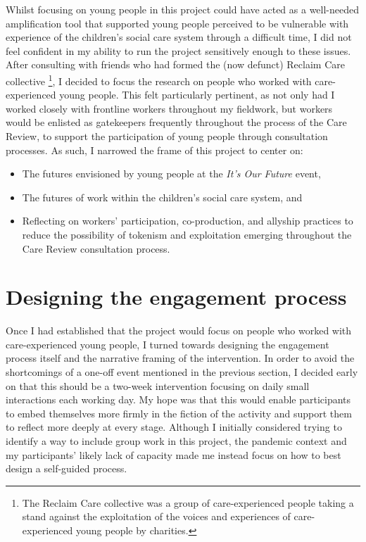 Whilst focusing on young people in this project could have acted as a well-needed amplification tool that supported young people perceived to be vulnerable with experience of the children's social care system through a difficult time, I did not feel confident in my ability to run the project sensitively enough to these issues. After consulting with friends who had formed the (now defunct) Reclaim Care collective \footnote{The Reclaim Care collective was a group of care-experienced people taking a stand against the exploitation of the voices and experiences of care-experienced young people by charities.}, I decided to focus the research on people who worked with care-experienced young people. This felt particularly pertinent, as not only had I worked closely with frontline workers throughout my fieldwork, but workers would be enlisted as gatekeepers frequently throughout the process of the Care Review, to support the participation of young people through consultation processes. As such, I narrowed the frame of this project to center on:
\begin{itemize}
    \item The futures envisioned by young people at the \emph{It's Our Future} event,
    \item The futures of work within the children's social care system, and
    \item Reflecting on workers' participation, co-production, and allyship practices to reduce the possibility of tokenism and exploitation emerging throughout the Care Review consultation process. 
\end{itemize}

\section{Designing the engagement process}
\label{sec:8-3-designing-engagement}
Once I had established that the project would focus on people who worked with care-experienced young people, I turned towards designing the engagement process itself and the narrative framing of the intervention. In order to avoid the shortcomings of a one-off event mentioned in the previous section, I decided early on that this should be a two-week intervention focusing on daily small interactions each working day. My hope was that this would enable participants to embed themselves more firmly in the fiction of the activity and support them to reflect more deeply at every stage. Although I initially considered trying to identify a way to include group work in this project, the pandemic context and my participants' likely lack of capacity made me instead focus on how to best design a self-guided process.

